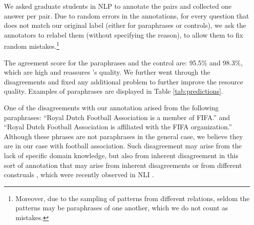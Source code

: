 We asked graduate students in NLP to  annotate the pairs and collected one answer per pair.
Due to random errors in the annotations, for every question
that does not match our original label (either for
paraphrases or controls), we ask the annotators to relabel
them (without specifying the reason), to allow them to fix
random mistakes.\footnote{Moreover, due to the sampling of
  patterns from different relations, seldom the patterns may
  be paraphrases of one another, which we do not count as
  mistakes.}


The agreement score for the paraphrases and the control are: 95.5\% and 98.3\%, which are high and reassures \resource's quality.
We further went through the disagreements  %
and fixed any additional problem %
to further improve the resource quality.
Examples of paraphrases are displayed in Table \ref{tab:predictions}. 
% 

One of the disagreements with our annotation arised from the following paraphrases: ``Royal Dutch Football Association is a member of FIFA.'' and ``Royal Dutch Football Association is affiliated with the FIFA organization.''
Although these phrases are not paraphrases in the general case, we believe they are in our case with football association. Such disagreement may arise from the lack of specific domain knowledge, but also from inherent disagreement in this sort of annotation that may arise from inherent disagreements \cite{pavlick2019inherent} or from different construals \cite{trott2020re}, which were recently observed in NLI \cite{elazar2020extraordinary}.
